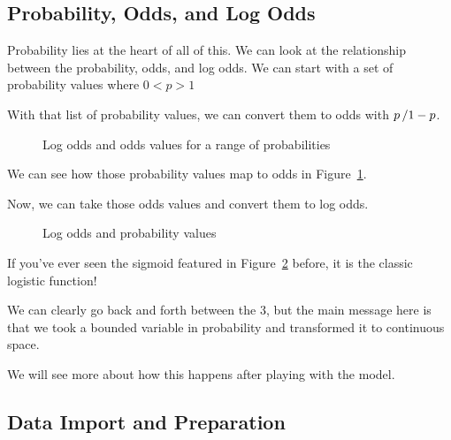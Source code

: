 \documentclass[
  letterpaper,
]{krantz}
\begin{document}
\subsection{Probability, Odds, and Log
Odds}\label{sec-glm-binomial-prob}

Probability lies at the heart of all of this. We can look at the
relationship between the probability, odds, and log odds. We can start
with a set of probability values where \(0 < p > 1\)

With that list of probability values, we can convert them to odds with
\(\\p\, / 1 - p\).

\begin{figure}[H]


\caption{\label{fig-odds-log-odds}Log odds and odds values for a range
of probabilities}

\end{figure}%

We can see how those probability values map to odds in
Figure~\ref{fig-odds-log-odds}.

Now, we can take those odds values and convert them to log odds.

\begin{figure}[H]


\caption{\label{fig-prob-log-odds}Log odds and probability values}

\end{figure}%

If you've ever seen the sigmoid featured in
Figure~\ref{fig-prob-log-odds} before, it is the classic logistic
function!

We can clearly go back and forth between the 3, but the main message
here is that we took a bounded variable in probability and transformed
it to continuous space.

We will see more about how this happens after playing with the model.

\subsection{Data Import and
Preparation}\label{data-import-and-preparation}
\end{document}
